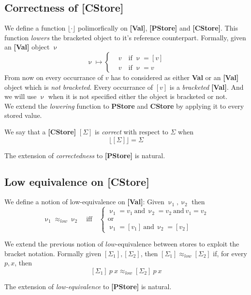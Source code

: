 \documentclass[12pt,a4paper,twoside]{book}
\begin{document}
\subsection{Correctness of \textbf{[CStore]}}
We define a function $\lfloor \cdot \rfloor$ polimorfically on \textbf{[Val]}, \textbf{[PStore]} and \textbf{[CStore]}. This function \emph{lowers} the bracketed object to it's reference counterpart.
Formally, given an \textbf{[Val]} object $\upnu$
$$
\upnu \mapsto \begin{cases}
	&v \quad \text{if $\upnu = [v]$}\\
    &v \quad \text{if $\upnu = v$}
    \end{cases}
$$
From now on every occurrance of $v$ has to considered as either \textbf{Val} or an \textbf{[Val]} object which is \emph{not bracketed}. Every occurrance of $[v]$ is a \emph{bracketed} \textbf{[Val]}. And we will use $\upnu$ when it is not specified either the object is bracketed or not.\\
We extend the \emph{lowering} function to \textbf{PStore} and \textbf{CStore} by applying it to every stored value.

We say that a \textbf{[CStore]} $[\Sigma]$ is \emph{correct} with respect to $\Sigma$ when
$$
\lfloor [\Sigma] \rfloor = \Sigma
$$

The extension of \emph{correctedness} to \textbf{[PStore]} is natural.


\subsection{Low equivalence on \textbf{[CStore]}}
We define a notion of low-equivalence on \textbf{[Val]}: Given $\upnu_1, \upnu_2$ then
\begin{equation}
\upnu_1 \approx_{low} \upnu_2
\quad\text{iff}\quad
\begin{cases}
\upnu_1 = v_1~\text{and}~\upnu_2 = v_2~\text{and}~v_1 = v_2\\
\text{or}\\
\upnu_1 = [v_1]~\text{and}~\upnu_2 = [v_2]
\end{cases}
\end{equation}

We extend the previous notion of $low$-equivalence between stores to exploit the bracket notation. Formally given $[\Sigma_1], [\Sigma_2]$, then $[\Sigma_1] \approx_{low} [\Sigma_2]$ if, for every $p, x$, then
$$
[\Sigma_1]~p~x \approx_{low} [\Sigma_2]~p~x
$$

The extension of \emph{low-equivalence} to \textbf{[PStore]} is natural.
\end{document}
